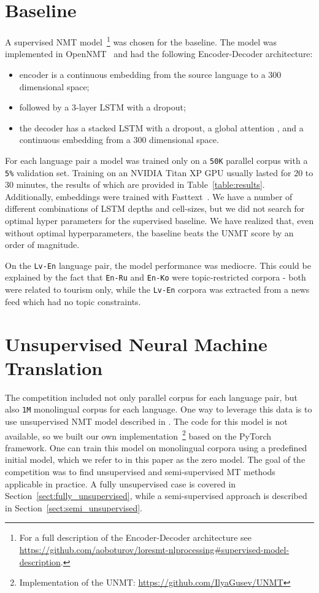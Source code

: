 \documentclass[]{article}
\begin{document}
\section{Baseline}
\label{sect:baseline}

A supervised \ac{NMT} model~\footnote{For a full description of the Encoder-Decoder architecture see \url{https://github.com/aoboturov/loresmt-nlprocessing\#supervised-model-description}.} was chosen for the baseline.
The model was implemented in OpenNMT~\citep{opennmt} and had the following Encoder-Decoder architecture:
\begin{itemize}
\item encoder is a continuous embedding from the source language to a $300$ dimensional space;
\item followed by a $3$-layer \acs{LSTM} with a dropout;
\item the decoder has a stacked \acs{LSTM} with a dropout, a global attention \citep{luong2015effective}, and a continuous embedding from a $300$ dimensional space.
\end{itemize}

For each language pair a model was trained only on a {\tt 50K} parallel corpus with a {\tt 5\%} validation set.
Training on an NVIDIA Titan XP GPU usually lasted for $20$ to $30$ minutes, the results of which are provided in Table~\ref{table:results}.
Additionally, embeddings were trained with Fasttext~\citep{bojanowski2016enriching}.
We have a number of different combinations of \acs{LSTM} depths and cell-sizes, but we did not search for optimal hyper parameters for the supervised baseline.
We have realized that, even without optimal hyperparameters, the baseline beats the \ac{UNMT} score by an order of magnitude.

On the {\tt Lv-En} language pair, the model performance was mediocre.
This could be explained by the fact that {\tt En-Ru} and {\tt En-Ko} were topic-restricted corpora - both were related to tourism only, while the {\tt Lv-En} corpora was extracted from a news feed which had no topic constraints.

\section{Unsupervised Neural Machine Translation}
\label{sect:unmt}

The competition included not only parallel corpus for each language pair, but also {\tt 1M} monolingual corpus for each language.
One way to leverage this data is to use unsupervised \ac{NMT} model described in \cite{DBLP:journals/corr/abs-1711-00043}.
The code for this model is not available, so we built our own implementation~\footnote{Implementation of the \acs{UNMT}: \url{https://github.com/IlyaGusev/UNMT}} based on the PyTorch~\citep{paszke2017automatic} framework.
One can train this model on monolingual corpora using a predefined initial model, which we refer to in this paper as the zero model.
The goal of the competition was to find unsupervised and semi-supervised \ac{MT} methods applicable in practice.
A fully unsupervised case is covered in Section~\ref{sect:fully_unsupervised}, while a semi-supervised approach is described in Section~\ref{sect:semi_unsupervised}.
\end{document}
